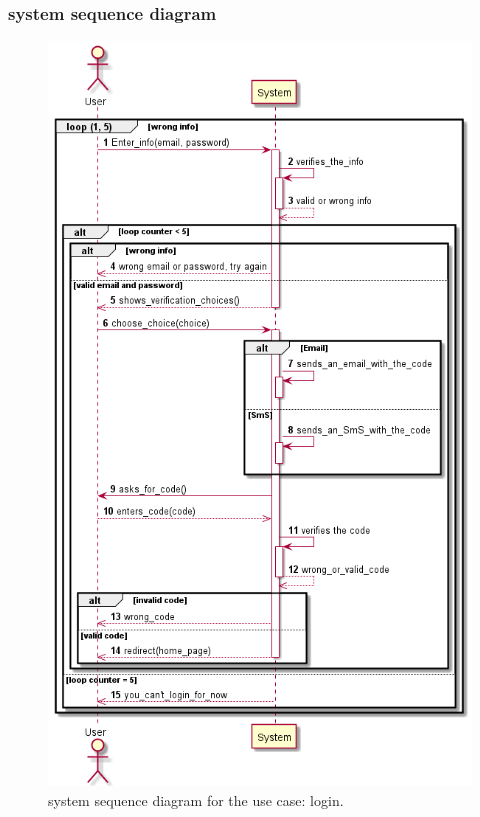 \documentclass[]{uc2pfecaneva}
\begin{document}
\subsubsection{system sequence diagram}
     \begin{figure}[h]
	
	\centering
	\includegraphics[width=\textwidth]{images/Login_dss}
	
	\caption{system sequence diagram for the use case: login.}
\end{figure}
\clearpage
\end{document}
